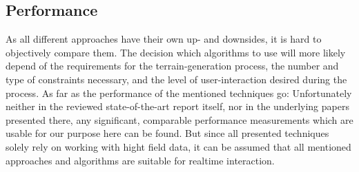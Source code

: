 \subsection{Performance}
As all different approaches have their own up- and downsides, it is hard to objectively compare them. The decision which algorithms to use will more likely depend of the requirements for the terrain-generation process, the number and type of constraints necessary, and the level of user-interaction desired during the process. As far as the performance of the mentioned techniques go: Unfortunately neither in the reviewed state-of-the-art report itself, nor in the underlying papers presented there, any significant, comparable performance measurements which are usable for our purpose here can be found. But since all presented techniques solely rely on working with hight field data, it can be assumed that all mentioned approaches and algorithms are suitable for realtime interaction.